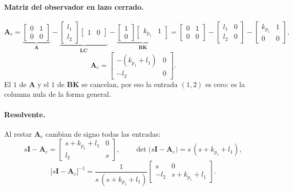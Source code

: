 \paragraph{Matriz del observador en lazo cerrado.}
\begin{equation}
\mathbf{A}_c =
\underbrace{\begin{bmatrix} 0 & 1 \\ 0 & 0 \end{bmatrix}}_{\mathbf{A}}
-\underbrace{\begin{bmatrix} l_1 \\ l_2 \end{bmatrix}\begin{bmatrix} 1 & 0 \end{bmatrix}}_{\mathbf{L}\mathbf{C}}
-\underbrace{\begin{bmatrix} 1 \\ 0 \end{bmatrix}\begin{bmatrix} k_{p_1} & 1 \end{bmatrix}}_{\mathbf{B}\mathbf{K}}
= \begin{bmatrix} 0 & 1 \\ 0 & 0 \end{bmatrix}
- \begin{bmatrix} l_1 & 0 \\ l_2 & 0 \end{bmatrix}
- \begin{bmatrix} k_{p_1} & 1 \\ 0 & 0 \end{bmatrix} ,
\end{equation}
\begin{equation}
\mathbf{A}_c = \begin{bmatrix} -(k_{p_1} + l_1) & 0 \\ -l_2 & 0 \end{bmatrix} .
\end{equation}
El $1$ de $\mathbf{A}$ y el $1$ de $\mathbf{B}\mathbf{K}$ se cancelan, por eso
la entrada $(1,2)$ es cero: es la columna nula de la forma general.

\paragraph{Resolvente.} Al restar $\mathbf{A}_c$ cambian de signo todas las entradas:
\begin{equation}
s\mathbf{I} - \mathbf{A}_c = \begin{bmatrix} s + k_{p_1} + l_1 & 0 \\ l_2 & s \end{bmatrix},
\qquad
\det\bigl(s\mathbf{I} - \mathbf{A}_c\bigr) = s\,(s + k_{p_1} + l_1) ,
\end{equation}
\begin{equation}
\bigl[s\mathbf{I} - \mathbf{A}_c\bigr]^{-1} = \frac{1}{s\,(s + k_{p_1} + l_1)}
\begin{bmatrix} s & 0 \\ -l_2 & s + k_{p_1} + l_1 \end{bmatrix} .
\end{equation}

